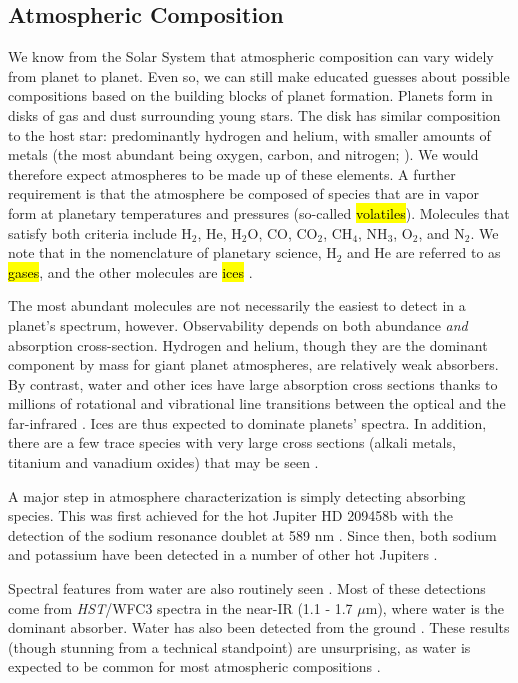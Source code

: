 \documentclass[graybox,natbib,nosecnum]{svmult}
\newcommand{\hbindex}[1]{\hl{#1}\index{#1}}  %
\newcommand{\project}[1]{\textsl{#1}}
\newcommand{\HST}{\project{HST}}
\begin{document}
\subsection{Atmospheric Composition}
We know from the Solar System that atmospheric composition can vary widely from planet to planet. Even so, we can still make educated guesses about possible compositions based on the building blocks of planet formation.  Planets form in disks of gas and dust surrounding young stars.  The disk has similar composition to the host star: predominantly hydrogen and helium, with smaller amounts of metals (the most abundant being oxygen, carbon, and nitrogen; \citealt{anders89}).  We would therefore expect atmospheres to be made up of these elements.  A further requirement is that the atmosphere be composed of species that are in vapor form at planetary temperatures and pressures (so-called \hbindex{volatiles}).  Molecules that satisfy both criteria include H$_2$, He, H$_2$O, CO, CO$_2$, CH$_4$, NH$_3$, O$_2$, and N$_2$.  We note that in the nomenclature of planetary science, H$_2$ and He are referred to as \hbindex{gases}, and the other molecules are \hbindex{ices} \citep{depater15}.

The most abundant molecules are not necessarily the easiest to detect in a planet's spectrum, however. Observability depends on both abundance \emph{and} absorption cross-section. Hydrogen and helium, though they are the dominant component by mass for giant planet atmospheres, are relatively weak absorbers. By contrast, water and other ices have large absorption cross sections thanks to millions of rotational and vibrational line transitions between the optical and the far-infrared \citep{tennyson12}.  Ices are thus expected to dominate planets' spectra.  In addition, there are a few trace species with very large cross sections (alkali metals, titanium and vanadium oxides) that may be seen \citep{seager00, fortney08}.

A major step in atmosphere characterization is simply detecting absorbing species. This was first achieved for the hot Jupiter HD 209458b with the detection of the sodium resonance doublet at 589 nm \citep{charbonneau02}. Since then, both sodium and potassium have been detected in a number of other hot Jupiters \citep[e.g.][]{sing11b, jensen11, nikolov14, fischer16}.

Spectral features from water are also routinely seen \citep[e.g.][]{deming13, huitson13, mccullough14, fraine14, kreidberg14b, kreidberg15b, line16, evans16}. Most of these detections come from \HST/WFC3 spectra in the near-IR (1.1 - 1.7 $\mu$m), where water is the dominant absorber. Water has also been detected from the ground \citep{birkby13, stevenson16b}.  These results (though stunning from a technical standpoint) are unsurprising, as water is expected to be common for most atmospheric compositions \citep{moses13}.
\end{document}
